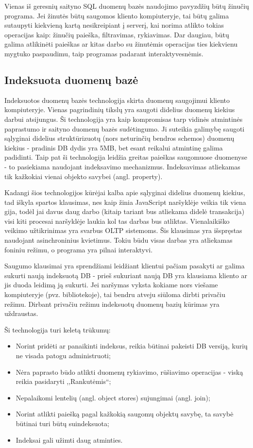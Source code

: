 \documentclass[12pt,a4paper,titlepage]{article}
\begin{document}
Vienas iš geresnių saityno SQL duomenų bazės naudojimo pavyzdžių būtų žinučių programa. Jei žinutės būtų saugomos kliento kompiuteryje, tai būtų galima sutaupyti kiekvieną kartą nesikreipiant į serverį, kai norima atlikto tokias operacijas kaip: žinučių paieška, filtravimas, rykiavimas. Dar daugiau, būtų galima atlikinėti paieškas ar kitas darbo su žinutėmis operacijas ties kiekvienu mygtuko paspaudimu, taip programas padarant interaktyvesnėmis.

\subsection{Indeksuota duomenų bazė}

Indeksuotos duomenų bazės technologija skirta duomenų saugojimui kliento kompiuteryje. Vienas pagrindinių tikslų yra saugoti didelius duomenų kiekius darbui atsijungus. Ši technologija yra kaip kompromisas tarp vidinės atmintinės paprastumo ir saityno duomenų bazės sudėtingumo. Ji suteikia galimybę saugoti sąlyginai didelius struktūrizuotų (nors neturinčių bendros schemos) duomenų kiekius - pradinis DB dydis yra 5MB, bet esant reikalui atmintinę galima padidinti. Taip pat ši technologija leidžia greitas paieškas saugomuose duomenyse - to pasiekiama naudojant indeksavimo mechanizmus. Indeksavimas atliekamas tik kažkokiai vienai objekto savybei (angl. property). 

Kadangi šios technologijos kūrėjai kalba apie sąlyginai didelius duomenų kiekius, tad iškyla spartos klausimas, nes kaip žinia JavaScript naršyklėje veikia tik viena gija, todėl jai davus daug darbo (kitaip tariant bus atliekama didelė transakcija) visi kiti procesai naršyklėje laukia kol tas darbas bus atliktas. Vienalaikiško veikimo užtikrinimas yra svarbus OLTP sistemoms. Šis klausimas yra išspręstas naudojant asinchroninius kvietimus. Tokiu būdu visas darbas yra atliekamas foniniu režimu, o programa yra pilnai interaktyvi.

Saugumo klausimai yra sprendžiami leidžiant klientui pačiam pasakyti ar galima sukurti naują indeksuotą DB - prieš sukuriant naują DB yra klausiama kliento ar jis duoda leidimą ją sukurti. Jei naršymas vyksta kokiame nors viešame kompiuteryje (pvz. bibliotekoje), tai bendru atveju siūloma dirbti privačiu režimu. Dirbant privačiu režimu indeksuotų duomenų bazių kūrimas yra uždraustas.

Ši technologija turi keletą trūkumų:
\begin{itemize}
  \item Norint pridėti ar panaikinti indeksus, reikia būtinai pakeisti DB versiją, kurių ne visada patogu administruoti;
  \item Nėra paprasto būdo atlikti duomenų rykiavimo, rūšiavimo operacijas - viską reikia pasidaryti ,,Rankutėmis``;
  \item Nepalaikomi lentelių (angl. object stores) sujungimai (angl. join);
  \item Norint atlikti paiešką pagal kažkokią saugomų objektų savybę, ta savybė būtinai turi būtų suindeksuota;
  \item Indeksai gali užimti daug atminties. 
\end{itemize}
\end{document}

